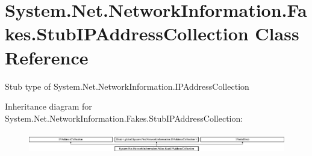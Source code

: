 \hypertarget{class_system_1_1_net_1_1_network_information_1_1_fakes_1_1_stub_i_p_address_collection}{\section{System.\-Net.\-Network\-Information.\-Fakes.\-Stub\-I\-P\-Address\-Collection Class Reference}
\label{class_system_1_1_net_1_1_network_information_1_1_fakes_1_1_stub_i_p_address_collection}
}


Stub type of System.\-Net.\-Network\-Information.\-I\-P\-Address\-Collection 


Inheritance diagram for System.\-Net.\-Network\-Information.\-Fakes.\-Stub\-I\-P\-Address\-Collection\-:\begin{figure}[H]
\begin{center}
\leavevmode
\includegraphics[height=0.926385cm]{class_system_1_1_net_1_1_network_information_1_1_fakes_1_1_stub_i_p_address_collection}
\end{center}
\end{figure}
